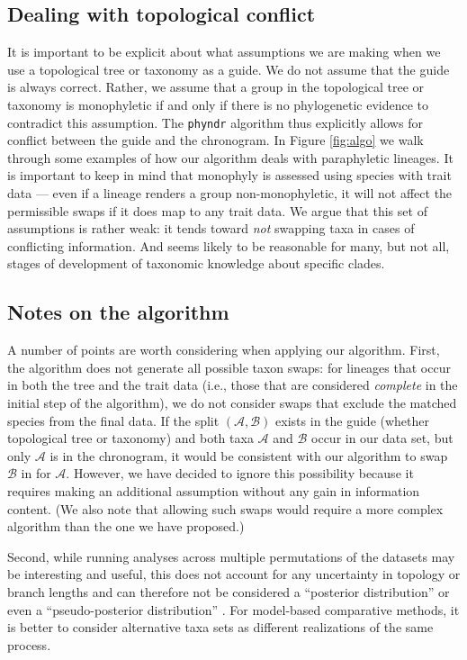\documentclass[a4paper,11pt]{article}
\newcommand{\phyndr}{\tt phyndr}
\begin{document}
\subsection{Dealing with topological conflict}

It is important to be explicit about what assumptions we are making when we use a topological tree or taxonomy as a guide. We do not assume that the guide is always correct. Rather, we assume that a group in the topological tree or taxonomy is monophyletic if and only if there is no phylogenetic evidence to contradict this assumption. The {\phyndr} algorithm thus explicitly allows for conflict between the guide and the chronogram. In Figure \ref{fig:algo} we walk through some examples of how our algorithm deals with paraphyletic lineages. It is important to keep in mind that monophyly is assessed using species with trait data --- even if a lineage renders a group non-monophyletic, it will not affect the permissible swaps if it does map to any trait data. We argue that this set of assumptions is rather weak: it tends toward \emph{not} swapping taxa in cases of conflicting information. And seems likely to be reasonable for many, but not all, stages of development of taxonomic knowledge about specific clades.

\subsection{Notes on the algorithm}

A number of points are worth considering when applying our algorithm. First, the algorithm does not generate all possible taxon swaps: for lineages that occur in both the tree and the trait data (i.e., those that are considered \emph{complete} in the initial step of the algorithm), we do not consider swaps that exclude the matched species from the final data. If the split $(\mathcal{A,B})$ exists in the guide (whether topological tree or taxonomy) and both taxa $\mathcal{A}$ and $\mathcal{B}$ occur in our data set, but only $\mathcal{A}$ is in the chronogram, it would be consistent with our algorithm to swap $\mathcal{B}$ in for $\mathcal{A}$. However, we have decided to ignore this possibility because it requires making an additional assumption without any gain in information content. (We also note that allowing such swaps would require a more complex algorithm than the one we have proposed.)

Second, while running analyses across multiple permutations of the datasets may be interesting and useful, this does not account for any uncertainty in topology or branch lengths and can therefore not be considered a ``posterior distribution'' or even a ``pseudo-posterior distribution'' \citep[\emph{sensu}][]{ThomasPastis, Rabosky2015}. For model-based comparative methods, it is better to consider alternative taxa sets as different realizations of the same process.
\end{document}

